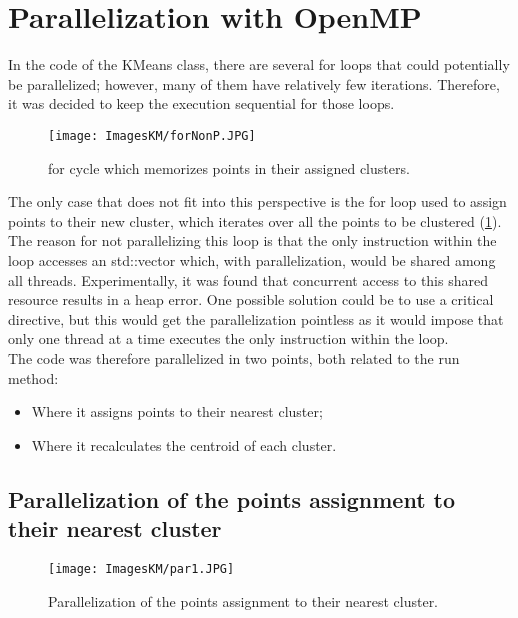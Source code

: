 \documentclass[10pt,twocolumn,letterpaper]{article}
\newcommand{\bit} {\begin{itemize} }
\newcommand{\eit} {\end{itemize} }
\begin{document}
\section{Parallelization with OpenMP}
\label{sec:par}
In the code of the KMeans class, there are several for loops that could potentially be parallelized; however, many of them have relatively few iterations. Therefore, it was decided to keep the execution sequential for those loops.

\begin{figure}[h]
    \centering
    \texttt{[image: ImagesKM/forNonP.JPG]}
    \caption{for cycle which memorizes points in their assigned clusters.}
    \label{fig:forNP}
\end{figure}

The only case that does not fit into this perspective is the for loop used to assign points to their new cluster, which iterates over all the points to be clustered (\cref{fig:forNP}).\\
The reason for not parallelizing this loop is that the only instruction within the loop accesses an std::vector which, with parallelization, would be shared among all threads. Experimentally, it was found that concurrent access to this shared resource results in a heap error. One possible solution could be to use a critical directive, but this would get the parallelization pointless as it would impose that only one thread at a time executes the only instruction within the loop.\\
The code was therefore parallelized in two points, both related to the run method:

\bit
    \item{Where it assigns points to their nearest cluster;}
    \item{Where it recalculates the centroid of each cluster.}
\eit

\subsection{Parallelization of the points assignment to their nearest cluster}

\begin{figure}[h]
    \centering
    \texttt{[image: ImagesKM/par1.JPG]}
    \caption{Parallelization of the points assignment to their nearest cluster.}
    \label{fig:p1}
\end{figure}
\end{document}
